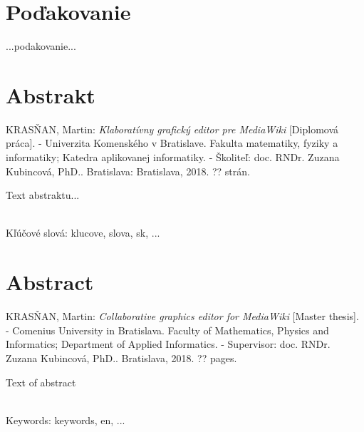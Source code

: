 \documentclass[12pt, a4paper, oneside]{book}
\newcommand\mftitle{Klaboratívny grafický editor pre MediaWiki}
\newcommand\enmftitle{Collaborative graphics editor for MediaWiki}
\newcommand\mfthesistype{Diplomová práca}
\newcommand\enmfthesistype{Master thesis}
\newcommand\mfadvisor{doc. RNDr. Zuzana Kubincová, PhD.}
\newcommand\mfplacedate{Bratislava, 2018}
\newcommand\mfpracovisko{Katedra aplikovanej informatiky}
\newcommand\enmfpracovisko{Department of Applied Informatics}
\begin{document}
\chapter*{Poďakovanie}\label{chap:thank_you}
...podakovanie...
\vfill\eject 

\chapter*{Abstrakt}\label{chap:abstract_sk}
\MakeUppercase{Krasňan}, Martin: \textit{\mftitle} [\mfthesistype]. - Univerzita Komenského v Bratislave. Fakulta matematiky, fyziky a informatiky; \mfpracovisko. - Školiteľ: \mfadvisor. Bratislava: \mfplacedate. ?? strán.

Text abstraktu...

~\\
Kľúčové slová: klucove, slova, sk, ...
\vfill\eject 

\chapter*{Abstract}\label{chap:abstract_en}
\MakeUppercase{Krasňan}, Martin: \textit{\enmftitle} [\enmfthesistype]. - Comenius University in Bratislava. Faculty of Mathematics, Physics and Informatics; \enmfpracovisko. - Supervisor: \mfadvisor. \mfplacedate. ?? pages.

Text of abstract

~\\
Keywords: keywords, en, ...
\vfill\eject 





\mainmatter










\backmatter

\nocite{*}


\end{document}
